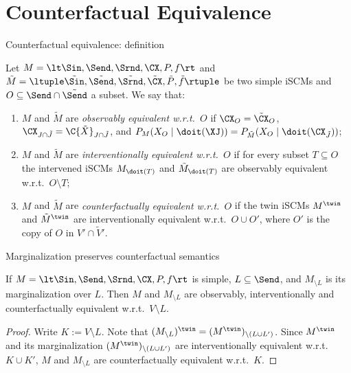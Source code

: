\part{Counterfactual Equivalence}
\frame{\partpage}

\begin{frame}{Counterfactual equivalence: definition}
  \begin{Def}[\ref{def:scm_counterfactual_equiv}]
  Let $M = \lt \Sin, \Send, \Srnd, \CX, P, f \rt$ and
  $\tilde{M} = \ltuple \tilde{\Sin}, \tilde{\Send}, \tilde{\Srnd}, \tilde{\CX}, \tilde{P}, \tilde{f} \rtuple$ be two simple iSCMs
  and $O \subseteq \Send \cap \tilde{\Send}$ a subset.
  We say that:
  \begin{enumerate}
    \item {\color{gray}$M$ and $\tilde{M}$ are \emph{observably equivalent w.r.t.\ $O$} if $\CX_O = \tilde{\CX}_O$, $\CX_{J\cap\tilde{J}} = \C{\tilde{X}}_{J\cap\tilde{J}}$, and $P_{M}(X_O \mid \doit(\XJ)) = P_{\tilde{M}}(X_O \mid \doit(\CX_{\tilde{J}}))$;}
    \item {\color{gray}$M$ and $\tilde{M}$ are \emph{interventionally equivalent w.r.t.\ $O$} if for every subset $T \subseteq O$ the intervened iSCMs $M_{\doit(T)}$ and $\tilde{M}_{\doit(T)}$ are observably equivalent w.r.t.\ $O \setminus T$;}
    \item $M$ and $\tilde{M}$ are \emph{counterfactually equivalent w.r.t.\ $O$} if the twin iSCMs $M^\twin$ and $\tilde{M}^\twin$ are interventionally equivalent w.r.t.\ $O \cup O'$, where
    $O'$ is the copy of $O$ in $V' \cap \tilde{V}'$.
  \end{enumerate}
  \end{Def}
\end{frame}

\begin{frame}{Marginalization preserves counterfactual semantics}
  \begin{Cor}[\ref{Cor:various_equiv_marginalization}]
  If $M = \lt \Sin, \Send, \Srnd, \CX, P, f \rt$ is simple, $L \subseteq \Send$, and
  $M_{\setminus L}$ is its marginalization over $L$. Then $M$ and $M_{\setminus L}$ are {\color{gray}observably,
  interventionally and} counterfactually equivalent w.r.t.\ $V \setminus L$.
  \end{Cor}
\begin{proof}
  Write $K := V \setminus L$.
  Note that $(M_{\setminus L})^\twin = (M^\twin)_{\setminus (L \cup L')}$. 
  Since $M^\twin$ and its marginalization
  $(M^\twin)_{\setminus (L \cup L')}$ are interventionally equivalent w.r.t.\ $K \cup K'$,
  $M$ and $M_{\setminus L}$ are counterfactually equivalent w.r.t.\ $K$.
\end{proof}
\end{frame}

